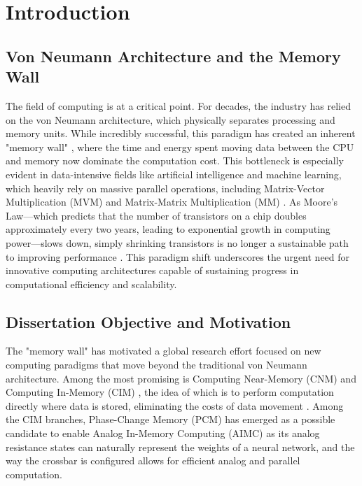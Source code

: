\chapter{Introduction}\label{chap:intro}
\section{Von Neumann Architecture and the Memory Wall}\label{sec:memwall}
The field of computing is at a critical point. For decades, the industry has relied on the von Neumann architecture, which physically separates processing and memory units.
While incredibly successful, this paradigm has created an inherent "memory wall" \cite{gholami_ai_2024,wulf_hitting_1995}, where the time and energy spent moving data between the CPU and memory now dominate the computation cost.
This bottleneck is especially evident in data-intensive fields like artificial intelligence and machine learning, which heavily rely on massive parallel operations, including  Matrix-Vector Multiplication (MVM) and Matrix-Matrix Multiplication (MM) \cite{gholami_ai_2024,khan_landscape_2024}.
As Moore's Law—which predicts that the number of transistors on a chip doubles approximately every two years, leading to exponential growth in computing power—slows down, simply shrinking transistors is no longer a sustainable path to improving performance \cite{theis_end_2017}.
This paradigm shift underscores the urgent need for innovative computing architectures capable of sustaining progress in computational efficiency and scalability.

\section{Dissertation Objective and Motivation}\label{sec:obj}

The "memory wall" has motivated a global research effort focused on new computing paradigms that move beyond the traditional von Neumann architecture.
Among the most promising is Computing Near-Memory (CNM) and Computing In-Memory (CIM) , the idea of which is to perform computation directly where data is stored, eliminating the costs of data movement \cite{khan_landscape_2024}.
Among the CIM branches, Phase-Change Memory (PCM) has emerged as a possible candidate to enable Analog In-Memory Computing (AIMC) as its analog resistance states can naturally represent the weights of a neural network, and the way the crossbar is configured allows for efficient analog and parallel computation.


